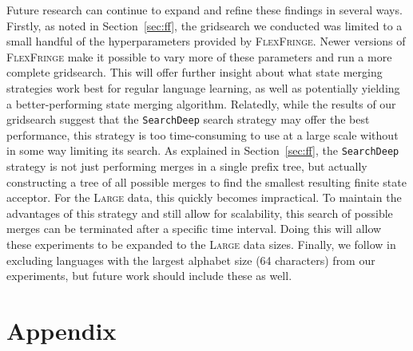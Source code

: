 \documentclass[twoside,11pt]{article}
\newcommand{\tscx}[1]{\textsc{#1}\xspace}
\newcommand{\lrg}{\tscx{Large}}
\begin{document}
Future research can continue to expand and refine these findings in several ways.
Firstly, as noted in Section~\ref{sec:ff}, the gridsearch we conducted was limited to a small handful of the hyperparameters provided by \textsc{FlexFringe}.
Newer versions of \textsc{FlexFringe} make it possible to vary more of these parameters and run a more complete gridsearch.
This will offer further insight about what state merging strategies work best for regular language learning, as well as potentially yielding a better-performing state merging algorithm.
Relatedly, while the results of our gridsearch suggest that the \texttt{SearchDeep} search strategy may offer the best performance, this strategy is too time-consuming to use at a large scale without in some way limiting its search.
As explained in Section~\ref{sec:ff}, the \texttt{SearchDeep} strategy is not just performing merges in a single prefix tree, but actually constructing a tree of all possible merges to find the smallest resulting finite state acceptor.
For the \lrg data, this quickly becomes impractical.
To maintain the advantages of this strategy and still allow for scalability, this search of possible merges can be terminated after a specific time interval.
Doing this will allow these experiments to be expanded to the \lrg data sizes.
Finally, we follow \citet{adil23} in excluding languages with the largest alphabet size (64 characters) from our experiments, but future work should include these as well.





\newpage
\appendix

\section*{Appendix}
\end{document}
